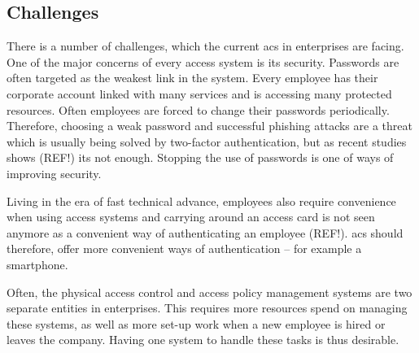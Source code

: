 \subsection{Challenges} \label{challenges}

There is a number of challenges, which the current \acrshort{acs} in enterprises are facing. One of the major concerns of every access system is its security. Passwords are often targeted as the weakest link in the system. Every employee has their corporate account linked with many services and is accessing many protected resources. Often employees are forced to change their passwords periodically. Therefore, choosing a weak password and successful phishing attacks are a threat which is usually being solved by two-factor authentication, but as recent studies shows
(REF!) its not enough. Stopping the use of passwords is one of ways of improving security.

Living in the era of fast technical advance, employees also require convenience when using access systems and carrying around an access card is not seen anymore as a convenient way of authenticating an employee 
(REF!). \acrshort{acs} should therefore, offer more convenient ways of authentication -- for example a smartphone.

Often, the physical access control and access policy management systems are two separate entities in enterprises. This requires more resources spend on managing these systems, as well as more set-up work when a new employee is hired or leaves the company. Having one system to handle these tasks is thus desirable.
